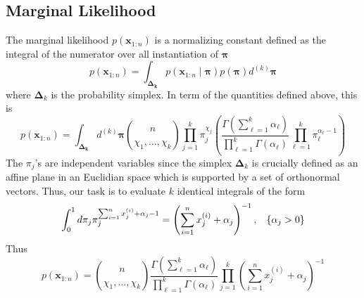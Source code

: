 \documentclass{article}
\newcommand{\s}{\hspace{0.1cm}}
\numberwithin{equation}{section}
\begin{document}
\subsection{Marginal Likelihood}
 The marginal likelihood $p(\mathbf{x}_{1:n})$ 
is a normalizing constant defined as the 
integral of the numerator over all instantiation of $\bm{ \pi} $
\[
        p(\mathbf{x}_{1:n}) = \int_{\bm{ \Delta_k}} 
        p(\mathbf{x}_{1:n} \mid \bm{ \pi})  p(\bm{ \pi} )d^{(k)}\bm{ \pi}  
\]
where $\bm{ \Delta}_k $ is the probability simplex. In term of the quantities 
defined above, this is
\[
         p(\mathbf{x}_{1:n}) = \int_{\bm{ \Delta_k}} 
         d^{(k)}\bm{ \pi} 
         \binom{n}{\chi_1,\dots,\chi_k}
       \prod_{j = 1}^k \pi_j^{\chi_j}
        \left( 
         \frac{\Gamma ( \sum _{\ell = 1}^k \alpha_\ell) }{\prod_{\ell=1}^k \Gamma(\alpha_\ell)} 
         \prod_{\ell = 1}^k \pi_\ell^{\alpha_\ell - 1}
        \right) 
\]
The $\pi_j$'s are independent variables since the simplex $\bm{ \Delta}_k $ is crucially 
defined as an affine plane in an Euclidian space which is supported by 
a set of orthonormal vectors.
Thus, our task is to evaluate $k$ identical integrals of the form
\[
        \int_0^1 d\pi_j \pi_j^{\sum_{i = 1}^n x_j^{(i)} + \alpha_j - 1}
        = 
        \left( \sum_{i = 1}^n x_j^{(i)} + \alpha_j \right)^{-1},
        \s\s\s
        \left\{ \alpha_j > 0 \right\}
\]
Thus
\[
        p(\mathbf{x}_{1:n}) = 
         \binom{n}{\chi_1,\dots,\chi_k}
         \frac{\Gamma ( \sum _{\ell = 1}^k \alpha_\ell) }{\prod_{\ell=1}^k \Gamma(\alpha_\ell)} 
 \prod_{j = 1}^k\left( \sum_{i = 1}^n x_j^{(i)} + \alpha_j \right)^{-1}


\]
\end{document}
